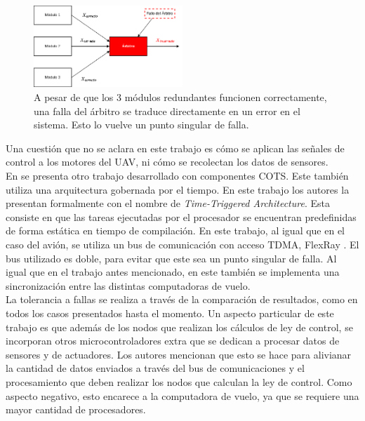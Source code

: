 \begin{figure}[H]
    \centering
    \includegraphics[width=0.5\textwidth]{img/falla_arbitro.png}
    \caption{A pesar de que los 3 módulos redundantes funcionen correctamente, una falla del árbitro se traduce directamente en un error en el sistema. Esto lo vuelve un punto singular de falla.}
    \label{fig:falla_arbitro}
\end{figure}

Una cuestión que no se aclara en este trabajo es cómo se aplican las señales de control a los motores del UAV, ni cómo se recolectan los datos de sensores.\\

En \cite{zhang2020architecture} se presenta otro trabajo desarrollado con componentes COTS. Este también utiliza una arquitectura gobernada por el tiempo. En este trabajo los autores la presentan formalmente con el nombre de \textit{Time-Triggered Architecture}. Esta consiste en que las tareas ejecutadas por el procesador se encuentran predefinidas de forma estática en tiempo de compilación. En este trabajo, al igual que en el caso del avión, se utiliza un bus de comunicación con acceso TDMA, FlexRay \cite{nxpAN12233}. El bus utilizado es doble, para evitar que este sea un punto singular de falla. Al igual que en el trabajo antes mencionado, en este también se implementa una sincronización entre las distintas computadoras de vuelo.\\

La tolerancia a fallas se realiza a través de la comparación de resultados, como en todos los casos presentados hasta el momento. Un aspecto particular de este trabajo es que además de los nodos que realizan los cálculos de ley de control, se incorporan otros microcontroladores extra que se dedican a procesar datos de sensores y de actuadores. Los autores mencionan que esto se hace para alivianar la cantidad de datos enviados a través del bus de comunicaciones y el procesamiento que deben realizar los nodos que calculan la ley de control. Como aspecto negativo, esto encarece a la computadora de vuelo, ya que se requiere una mayor cantidad de procesadores.\\

